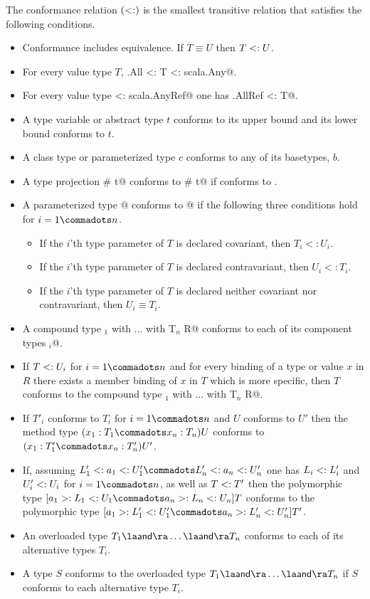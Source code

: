 \documentclass[11pt]{report}
\begin{document}
The conformance relation $(<:)$ is the smallest 
transitive relation that satisfies the following conditions.
\begin{itemize}
\item Conformance includes equivalence. If $T \equiv U$ then $T <: U$.
\item For every value type $T$, \verb@scala.All <: T <: scala.Any@. 
\item For every value type \verb@T <: scala.AnyRef@ one has \verb@scala.AllRef <: T@.
\item A type variable or abstract type $t$ conforms to its upper bound and
      its lower bound conforms to $t$. 
\item A class type or parameterized type $c$ conforms to any of its basetypes, $b$.
\item A type projection \verb@T # t@ conforms to \verb@U # t@ if 
      \verb@T@ conforms to \verb@U@.
\item A parameterized type \verb@T[T$_1$, ..., T$_n$]@ conforms to 
      \verb@T[U$_1$, ..., U$_n$]@ if
      the following three conditions hold for $i = 1 \commadots n$. 
      \begin{itemize}
      \item
      If the $i$'th type parameter of $T$ is declared covariant, then $T_i <: U_i$.
      \item
      If the $i$'th type parameter of $T$ is declared contravariant, then $U_i <: T_i$.
      \item
      If the $i$'th type parameter of $T$ is declared neither covariant 
      nor contravariant, then $U_i \equiv T_i$.
      \end{itemize}
\item A compound type \verb@T$_1$ with ... with T$_n$ {R}@ conforms to
      each of its component types \verb@T$_i$@.
\item If $T <: U_i$ for $i = 1 \commadots n$ and for every
      binding of a type or value $x$ in $R$ there exists a member binding of
      $x$ in $T$ which is more specific, then $T$ conforms to
      the compound type \verb@T$_1$ with ... with T$_n$ {R}@.  
\item If
	$T'_i$ conforms to $T_i$ for $i = 1 \commadots n$ and $U$ conforms to $U'$ 
        then the method type $(x_1: T_1 \commadots x_n: T_n) U$ conforms to
	$(x_1: T'_1 \commadots x_n: T'_n) U'$.
\item If, assuming 
$L'_1 \conforms a_1 \conforms U'_1 \commadots L'_n \conforms a_n \conforms U'_n$ 
one has $L_i <: L'_i$ and $U'_i <: U_i$
for $i = 1 \commadots n$, as well as $T <: T'$ then the polymorphic type
$[a_1 >: L_1 <: U_1 \commadots a_n >: L_n <: U_n] T$ conforms to the polymorphic type
$[a_1 >: L'_1 <: U'_1 \commadots a_n >: L'_n <: U'_n] T'$.
\item 
An overloaded type $T_1 \overload \ldots \overload T_n$ conforms to each of its alternative types $T_i$.
\item
A type $S$ conforms to the overloaded type $T_1 \overload \ldots \overload T_n$
if $S$ conforms to each alternative type $T_i$.
\end{itemize}
\end{document}
